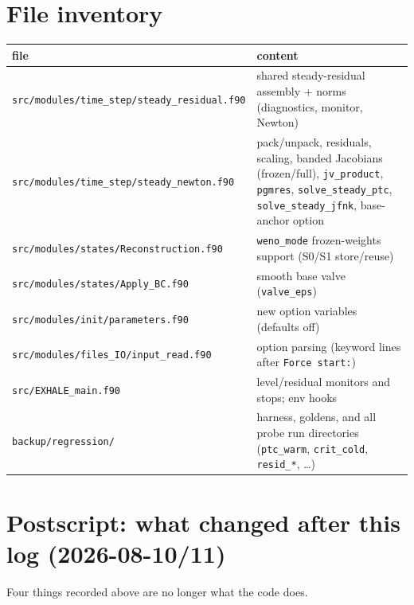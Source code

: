 \documentclass[english,a4paper]{my_memo}
\newcommand{\code}[1]{\texttt{#1}}
\begin{document}
\section{File inventory}\label{sec:files}

\begin{center}\small
\begin{tabular}{lp{}}
\toprule
file & content\\
\midrule
\code{src/modules/time\_step/steady\_residual.f90} & shared steady-residual
 assembly + norms (diagnostics, monitor, Newton)\\
\code{src/modules/time\_step/steady\_newton.f90} & pack/unpack, residuals,
 scaling, banded Jacobians (frozen/full), \code{jv\_product},
 \code{pgmres}, \code{solve\_steady\_ptc}, \code{solve\_steady\_jfnk},
 base-anchor option\\
\code{src/modules/states/Reconstruction.f90} & \code{weno\_mode}
 frozen-weights support (S0/S1 store/reuse)\\
\code{src/modules/states/Apply\_BC.f90} & smooth base valve
 (\code{valve\_eps})\\
\code{src/modules/init/parameters.f90} & new option variables (defaults
 off)\\
\code{src/modules/files\_IO/input\_read.f90} & option parsing (keyword
 lines after \code{Force start:})\\
\code{src/EXHALE\_main.f90} & level/residual monitors and stops; env hooks\\
\code{backup/regression/} & harness, goldens, and all probe run directories
 (\code{ptc\_warm}, \code{crit\_cold}, \code{resid\_*}, \dots)\\
\bottomrule
\end{tabular}
\end{center}

\section{Postscript: what changed after this log (2026-08-10/11)}
\label{sec:postscript}

Four things recorded above are no longer what the code does.
\end{document}
